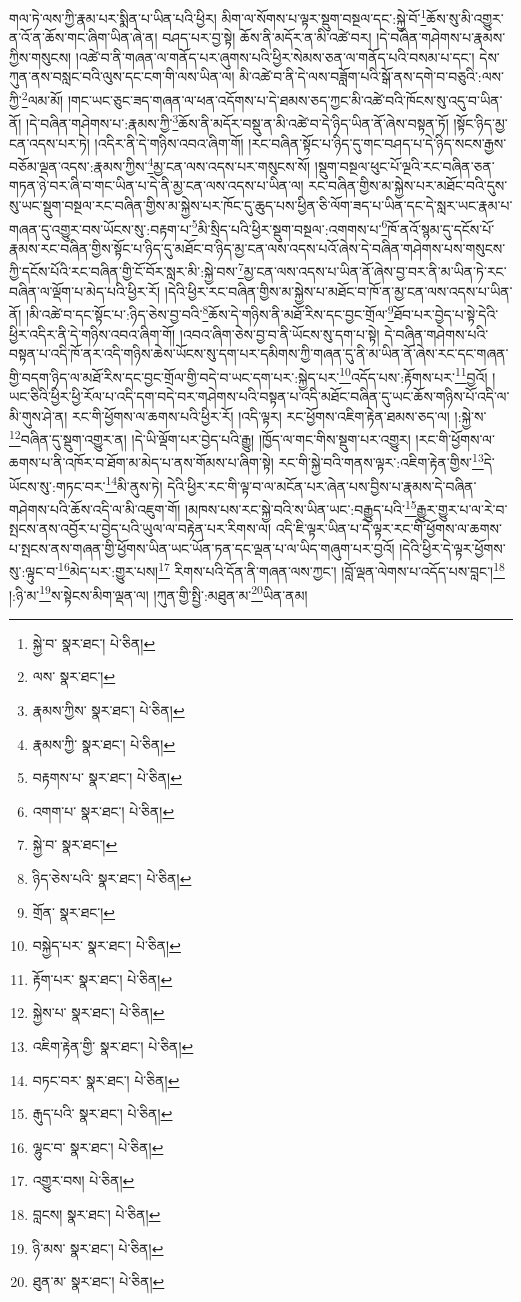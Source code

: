 གལ་ཏེ་ལས་ཀྱི་རྣམ་པར་སྨིན་པ་ཡིན་པའི་ཕྱིར། མིག་ལ་སོགས་པ་ལྟར་སྡུག་བསྔལ་དང་:སྐྱེ་བོ་\footnote{སྐྱེ་བ་  སྣར་ཐང་།  པེ་ཅིན། }ཆོས་སུ་མི་འགྱུར་ན་འོ་ན་ཆོས་གང་ཞིག་ཡིན་ཞེ་ན། བཤད་པར་བྱ་སྟེ། ཆོས་ནི་མདོར་ན་མི་འཚེ་བར། །དེ་བཞིན་གཤེགས་པ་རྣམས་ཀྱིས་གསུངས། །འཚེ་བ་ནི་གཞན་ལ་གནོད་པར་ཞུགས་པའི་ཕྱིར་སེམས་ཅན་ལ་གནོད་པའི་བསམ་པ་དང་། དེས་ཀུན་ནས་བསླང་བའི་ལུས་དང་ངག་གི་ལས་ཡིན་ལ། མི་འཚེ་བ་ནི་དེ་ལས་བཟློག་པའི་སྒོ་ནས་དགེ་བ་བཅུའི་:ལས་ཀྱི་\footnote{ལས་  སྣར་ཐང་། }ལམ་མོ། །གང་ཡང་ཅུང་ཟད་གཞན་ལ་ཕན་འདོགས་པ་དེ་ཐམས་ཅད་ཀྱང་མི་འཚེ་བའི་ཁོངས་སུ་འདུ་བ་ཡིན་ནོ། །དེ་བཞིན་གཤེགས་པ་:རྣམས་ཀྱི་\footnote{རྣམས་ཀྱིས་  སྣར་ཐང་།  པེ་ཅིན། }ཆོས་ནི་མདོར་བསྡུ་ན་མི་འཚེ་བ་དེ་ཉིད་ཡིན་ནོ་ཞེས་བསྟན་ཏོ། །སྟོང་ཉིད་མྱ་ངན་འདས་པར་ཏེ། །འདིར་ནི་དེ་གཉིས་འབའ་ཞིག་གོ། །རང་བཞིན་སྟོང་པ་ཉིད་དུ་གང་བཤད་པ་དེ་ཉིད་སངས་རྒྱས་བཅོམ་ལྡན་འདས་:རྣམས་ཀྱིས་\footnote{རྣམས་ཀྱི་  སྣར་ཐང་།  པེ་ཅིན། }མྱ་ངན་ལས་འདས་པར་གསུངས་སོ། །སྡུག་བསྔལ་ཕུང་པོ་ལྔའི་རང་བཞིན་ཅན་གཏན་ཉེ་བར་ཞི་བ་གང་ཡིན་པ་དེ་ནི་མྱ་ངན་ལས་འདས་པ་ཡིན་ལ། རང་བཞིན་གྱིས་མ་སྐྱེས་པར་མཐོང་བའི་དུས་སུ་ཡང་སྡུག་བསྔལ་རང་བཞིན་གྱིས་མ་སྐྱེས་པར་ཁོང་དུ་ཆུད་པས་ཕྱིན་ཅི་ལོག་ཟད་པ་ཡིན་དང་དེ་སླར་ཡང་རྣམ་པ་གཞན་དུ་འགྱུར་བས་ཡོངས་སུ་:བརྟག་པ་\footnote{བརྟགས་པ་  སྣར་ཐང་།  པེ་ཅིན། }མི་སྲིད་པའི་ཕྱིར་སྡུག་བསྔལ་:འགགས་པ་\footnote{འགག་པ་  སྣར་ཐང་།  པེ་ཅིན། }ཁོ་ནའོ་སྙམ་དུ་དངོས་པོ་རྣམས་རང་བཞིན་གྱིས་སྟོང་པ་ཉིད་དུ་མཐོང་བ་ཉིད་མྱ་ངན་ལས་འདས་པའོ་ཞེས་དེ་བཞིན་གཤེགས་པས་གསུངས་ཀྱི་དངོས་པོའི་རང་བཞིན་གྱི་ངོ་བོར་སླར་མི་:སྐྱེ་བས་\footnote{སྐྱེ་བ་  སྣར་ཐང་། }མྱ་ངན་ལས་འདས་པ་ཡིན་ནོ་ཞེས་བྱ་བར་ནི་མ་ཡིན་ཏེ་རང་བཞིན་ལ་ལྡོག་པ་མེད་པའི་ཕྱིར་རོ། །དེའི་ཕྱིར་རང་བཞིན་གྱིས་མ་སྐྱེས་པ་མཐོང་བ་ཁོ་ན་མྱ་ངན་ལས་འདས་པ་ཡིན་ནོ། །མི་འཚེ་བ་དང་སྟོང་པ་:ཉིད་ཅེས་བྱ་བའི་\footnote{ཉིད་ཅེས་པའི་  སྣར་ཐང་།  པེ་ཅིན། }ཆོས་དེ་གཉིས་ནི་མཐོ་རིས་དང་བྱང་གྲོལ་\footnote{གྲོན་  སྣར་ཐང་། }ཐོབ་པར་བྱེད་པ་སྟེ་དེའི་ཕྱིར་འདིར་ནི་དེ་གཉིས་འབའ་ཞིག་གོ། །འབའ་ཞིག་ཅེས་བྱ་བ་ནི་ཡོངས་སུ་དག་པ་སྟེ། དེ་བཞིན་གཤེགས་པའི་བསྟན་པ་འདི་ཁོ་ནར་འདི་གཉིས་ཆེས་ཡོངས་སུ་དག་པར་དམིགས་ཀྱི་གཞན་དུ་ནི་མ་ཡིན་ནོ་ཞེས་རང་དང་གཞན་གྱི་བདག་ཉིད་ལ་མཐོ་རིས་དང་བྱང་གྲོལ་གྱི་བདེ་བ་ཡང་དག་པར་:སྐྱེད་པར་\footnote{བསྐྱེད་པར་  སྣར་ཐང་།  པེ་ཅིན། }འདོད་པས་:རྟོགས་པར་\footnote{རྟོག་པར་  སྣར་ཐང་།  པེ་ཅིན། }བྱའོ། །ཡང་ཅིའི་ཕྱིར་ཕྱི་རོལ་པ་འདི་དག་བདེ་བར་གཤེགས་པའི་བསྟན་པ་འདི་མཐོང་བཞིན་དུ་ཡང་ཆོས་གཉིས་པོ་འདི་ལ་མི་གུས་ཤེ་ན། རང་གི་ཕྱོགས་ལ་ཆགས་པའི་ཕྱིར་རོ། །འདི་ལྟར། རང་ཕྱོགས་འཇིག་རྟེན་ཐམས་ཅད་ལ། །:སྐྱེ་ས་\footnote{སྐྱེས་པ་  སྣར་ཐང་།  པེ་ཅིན། }བཞིན་དུ་སྡུག་འགྱུར་ན། །དེ་ཡི་ལྡོག་པར་བྱེད་པའི་རྒྱུ། །ཁྱོད་ལ་གང་གིས་སྡུག་པར་འགྱུར། །རང་གི་ཕྱོགས་ལ་ཆགས་པ་ནི་འཁོར་བ་ཐོག་མ་མེད་པ་ནས་གོམས་པ་ཞིག་སྟེ། རང་གི་སྐྱེ་བའི་གནས་ལྟར་:འཇིག་རྟེན་གྱིས་\footnote{འཇིག་རྟེན་གྱི་  སྣར་ཐང་།  པེ་ཅིན། }དེ་ཡོངས་སུ་:གཏང་བར་\footnote{བཏང་བར་  སྣར་ཐང་།  པེ་ཅིན། }མི་ནུས་ཏེ། དེའི་ཕྱིར་རང་གི་ལྟ་བ་ལ་མངོན་པར་ཞེན་པས་བྱིས་པ་རྣམས་དེ་བཞིན་གཤེགས་པའི་ཆོས་འདི་ལ་མི་འཇུག་གོ། །མཁས་པས་རང་སྐྱེ་བའི་ས་ཡིན་ཡང་:བརྒྱུད་པའི་\footnote{རྒུད་པའི་  སྣར་ཐང་།  པེ་ཅིན། }རྒྱུར་གྱུར་པ་ལ་རེ་བ་སྤངས་ནས་འབྱོར་པ་བྱེད་པའི་ཡུལ་ལ་བརྟེན་པར་རིགས་ལ། འདི་ཇི་ལྟར་ཡིན་པ་དེ་ལྟར་རང་གི་ཕྱོགས་ལ་ཆགས་པ་སྤངས་ནས་གཞན་གྱི་ཕྱོགས་ཡིན་ཡང་ཡོན་ཏན་དང་ལྡན་པ་ལ་ཡིད་གཞུག་པར་བྱའོ། །དེའི་ཕྱིར་དེ་ལྟར་ཕྱོགས་སུ་:ལྟུང་བ་\footnote{ལྷུང་བ་  སྣར་ཐང་།  པེ་ཅིན། }མེད་པར་:གྱུར་པས།\footnote{འགྱུར་བས།  པེ་ཅིན། } རིགས་པའི་དོན་ནི་གཞན་ལས་ཀྱང་། །བློ་ལྡན་ལེགས་པ་འདོད་པས་བླང་།\footnote{བླངས།  སྣར་ཐང་།  པེ་ཅིན། } །:ཉི་མ་\footnote{ཉི་མས་  སྣར་ཐང་།  པེ་ཅིན། }ས་སྟེངས་མིག་ལྡན་ལ། །ཀུན་གྱི་སྤྱི་:མཐུན་མ་\footnote{ཐུན་མ་  སྣར་ཐང་།  པེ་ཅིན། }ཡིན་ནམ། 